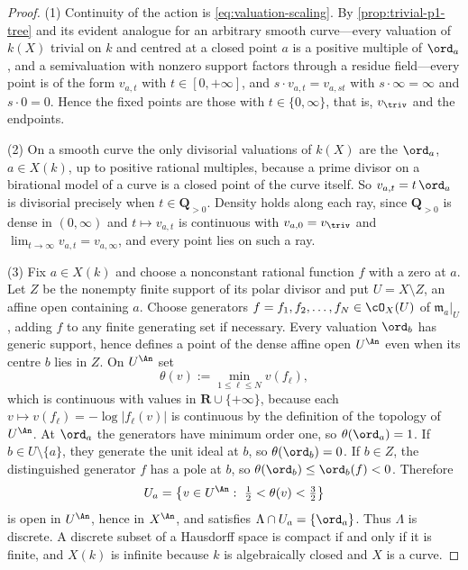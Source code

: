 \begin{proof}
(1)  Continuity of the action is \eqref{eq:valuation-scaling}.  By
\cref{prop:trivial-p1-tree} and its evident analogue for an arbitrary smooth
curve---every valuation of $k(X)$ trivial on $k$ and centred at a closed
point $a$ is a positive multiple of $\ord_a$, and a semivaluation with
nonzero support factors through a residue field---every point is of the form
$v_{a,t}$ with $t\in[0,+\infty]$, and $s\cdot v_{a,t}=v_{a,st}$ with
$s\cdot\infty=\infty$ and $s\cdot0=0$.  Hence the fixed points are those with
$t\in\{0,\infty\}$, that is, $v_\triv$ and the endpoints.

(2)  On a smooth curve the only divisorial valuations of $k(X)$ are the
$\ord_a$, $a\in X(k)$, up to positive rational multiples, because a prime
divisor on a birational model of a curve is a closed point of the curve
itself.  So $v_{a,t}=t\,\ord_a$ is divisorial precisely when
$t\in\mathbf Q_{>0}$.  Density holds along each ray, since
$\mathbf Q_{>0}$ is dense in $(0,\infty)$ and $t\mapsto v_{a,t}$ is
continuous with $v_{a,0}=v_\triv$ and
$\lim_{t\to\infty}v_{a,t}=v_{a,\infty}$, and every point lies on such a ray.

(3)  Fix $a\in X(k)$ and choose a nonconstant rational function $f$ with a
zero at $a$.  Let $Z$ be the nonempty finite support of its polar divisor and
put $U=X\setminus Z$, an affine open containing $a$.  Choose generators
$f=f_1,f_2,\ldots,f_N\in\cO_X(U)$ of $\mathfrak m_a|_U$, adding $f$ to any
finite generating set if necessary.  Every valuation $\ord_b$ has generic
support, hence defines a point of the dense affine open $U^{\An}$ even when
its centre $b$ lies in $Z$.  On $U^{\An}$ set
\[
 \theta(v):=\min_{1\leq\ell\leq N}v(f_\ell) ,
\]
which is continuous with values in $\mathbf R\cup\{+\infty\}$, because each
$v\mapsto v(f_\ell)=-\log|f_\ell(v)|$ is continuous by the definition of the
topology of $U^{\An}$.  At $\ord_a$ the generators have minimum order one,
so $\theta(\ord_a)=1$.  If $b\in U\setminus\{a\}$, they generate the unit
ideal at $b$, so $\theta(\ord_b)=0$.  If $b\in Z$, the distinguished
generator $f$ has a pole at $b$, so
$\theta(\ord_b)\leq\ord_b(f)<0$.  Therefore
\[
 U_a=\bigl\{v\in U^{\An}:\ \tfrac12<\theta(v)<\tfrac32\bigr\}
\]
is open in $U^{\An}$, hence in $X^{\An}$, and satisfies
$\Lambda\cap U_a=\{\ord_a\}$.  Thus $\Lambda$ is discrete.  A discrete
subset of a Hausdorff space is compact if
and only if it is finite, and $X(k)$ is infinite because $k$ is
algebraically closed and $X$ is a curve.
\end{proof}

